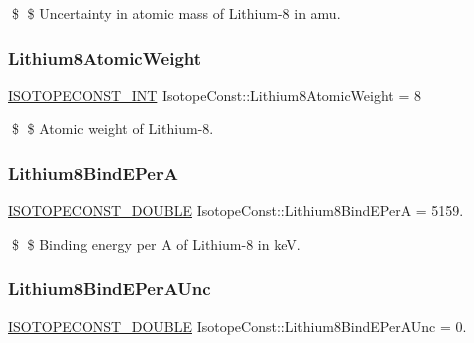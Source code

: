 \$ \$ Uncertainty in atomic mass of Lithium-\/8 in amu. \mbox{\label{group___isotope_const-_lithium-_li8_gac6f8852666a61b9aef6645688cbf7ac3}} 
\subsubsection{\texorpdfstring{Lithium8\+Atomic\+Weight}{Lithium8AtomicWeight}}
{\footnotesize\ttfamily \mbox{\hyperlink{group___isotope_const-_macros_ga5f18360b3e99483a35c32d789e62621c}{I\+S\+O\+T\+O\+P\+E\+C\+O\+N\+S\+T\+\_\+\+I\+NT}} Isotope\+Const\+::\+Lithium8\+Atomic\+Weight = 8}

\$ \$ Atomic weight of Lithium-\/8. \mbox{\label{group___isotope_const-_lithium-_li8_ga1e28fb13a74dd9f05737b7154ce859e9}} 
\subsubsection{\texorpdfstring{Lithium8\+Bind\+E\+PerA}{Lithium8BindEPerA}}
{\footnotesize\ttfamily \mbox{\hyperlink{group___isotope_const-_macros_ga8f45a7272ce02c0b4c65c44636ed719a}{I\+S\+O\+T\+O\+P\+E\+C\+O\+N\+S\+T\+\_\+\+D\+O\+U\+B\+LE}} Isotope\+Const\+::\+Lithium8\+Bind\+E\+PerA = 5159.}

\$ \$ Binding energy per A of Lithium-\/8 in keV. \mbox{\label{group___isotope_const-_lithium-_li8_gad44daad42a319fb49a405c077278fc16}} 
\subsubsection{\texorpdfstring{Lithium8\+Bind\+E\+Per\+A\+Unc}{Lithium8BindEPerAUnc}}
{\footnotesize\ttfamily \mbox{\hyperlink{group___isotope_const-_macros_ga8f45a7272ce02c0b4c65c44636ed719a}{I\+S\+O\+T\+O\+P\+E\+C\+O\+N\+S\+T\+\_\+\+D\+O\+U\+B\+LE}} Isotope\+Const\+::\+Lithium8\+Bind\+E\+Per\+A\+Unc = 0.}

